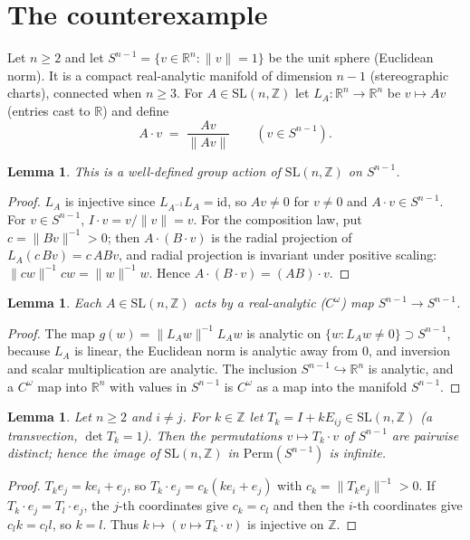 \documentclass[11pt]{article}
\newtheorem{lemma}[theorem]{Lemma}
\theoremstyle{definition}
\theoremstyle{remark}
\renewcommand{\_}{\oldus\allowbreak}
\newcommand{\Z}{\mathbb{Z}}
\newcommand{\R}{\mathbb{R}}
\newcommand{\SL}{\mathrm{SL}}
\begin{document}
\section{The counterexample}

Let $n\ge 2$ and let $S^{n-1}=\{v\in\R^n : \|v\|=1\}$ be the unit sphere (Euclidean norm). It is a
compact real-analytic manifold of dimension $n-1$ (stereographic charts), connected when $n\ge 3$.
For $A\in\SL(n,\Z)$ let $L_A:\R^n\to\R^n$ be $v\mapsto Av$ (entries cast to $\R$) and define
\[
  A\cdot v \;=\; \frac{Av}{\|Av\|}\qquad (v\in S^{n-1}).
\]

\begin{lemma}\label{lem:action}
This is a well-defined group action of $\SL(n,\Z)$ on $S^{n-1}$.
\end{lemma}

\begin{proof}
$L_A$ is injective since $L_{A^{-1}}L_A=\mathrm{id}$, so $Av\ne 0$ for $v\ne 0$ and $A\cdot v\in S^{n-1}$.
For $v\in S^{n-1}$, $I\cdot v=v/\|v\|=v$. For the composition law, put $c=\|Bv\|^{-1}>0$; then
$A\cdot(B\cdot v)$ is the radial projection of $L_A(c\,Bv)=c\,ABv$, and radial projection is invariant
under positive scaling: $\|cw\|^{-1}cw=\|w\|^{-1}w$. Hence $A\cdot(B\cdot v)=(AB)\cdot v$.
\end{proof}

\begin{lemma}\label{lem:analytic}
Each $A\in\SL(n,\Z)$ acts by a real-analytic ($C^\omega$) map $S^{n-1}\to S^{n-1}$.
\end{lemma}

\begin{proof}
The map $g(w)=\|L_Aw\|^{-1}L_Aw$ is analytic on $\{w : L_A w\ne 0\}\supset S^{n-1}$, because $L_A$ is
linear, the Euclidean norm is analytic away from $0$, and inversion and scalar multiplication are analytic.
The inclusion $S^{n-1}\hookrightarrow\R^n$ is analytic, and a $C^\omega$ map into $\R^n$ with values in
$S^{n-1}$ is $C^\omega$ as a map into the manifold $S^{n-1}$.
\end{proof}

\begin{lemma}\label{lem:infinite}
Let $n\ge 2$ and $i\ne j$. For $k\in\Z$ let $T_k=I+kE_{ij}\in\SL(n,\Z)$ (a transvection,
$\det T_k=1$). Then the permutations $v\mapsto T_k\cdot v$ of $S^{n-1}$ are pairwise distinct; hence the
image of $\SL(n,\Z)$ in $\mathrm{Perm}(S^{n-1})$ is infinite.
\end{lemma}

\begin{proof}
$T_k e_j = k e_i + e_j$, so $T_k\cdot e_j = c_k(k e_i + e_j)$ with $c_k=\|T_ke_j\|^{-1}>0$. If
$T_k\cdot e_j = T_l\cdot e_j$, the $j$-th coordinates give $c_k=c_l$ and then the $i$-th coordinates give
$c_l k = c_l l$, so $k=l$. Thus $k\mapsto(v\mapsto T_k\cdot v)$ is injective on $\Z$.
\end{proof}
\end{document}

